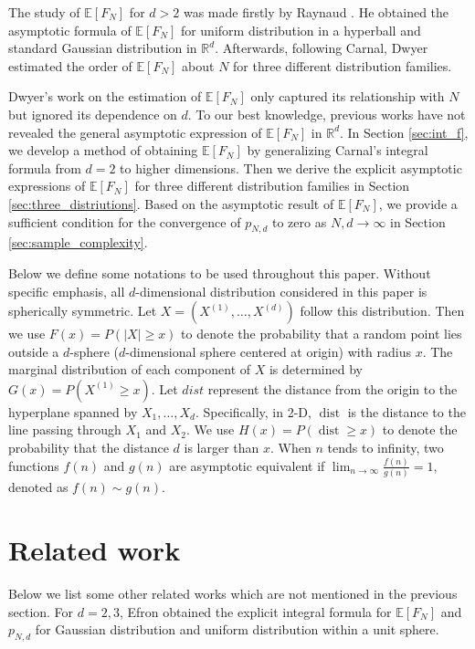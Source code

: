 \documentclass{aptpub}
\DeclareMathOperator{\dist}{dist}
\def\E{\mathbb{E}}
\def\R{\mathbb{R}}
\begin{document}
The study of $\E[F_N]$ for $d>2$ was made firstly by
Raynaud
\cite{raynaud1970enveloppe}.
He obtained the asymptotic formula of $\E[F_N]$
for uniform distribution in a hyperball
and standard Gaussian distribution in $\mathbb{R}^d$.
Afterwards, following Carnal, Dwyer \cite{dwyer1991convex}
estimated the order of $\E[F_N]$ about $N$
for three different distribution families.

Dwyer's work on the estimation of $\E[F_N]$ only captured its relationship with $N$ but ignored its
dependence on $d$. To our best knowledge, previous works have not revealed the general asymptotic expression of $\E[F_N]$ in $\R^d$.
In Section \ref{sec:int_f}, we develop a method of obtaining $\E[F_N]$ by generalizing Carnal's integral formula
from $d=2$ to higher dimensions.
Then we derive the explicit asymptotic
expressions of $\E[F_N]$ for three different distribution families in Section \ref{sec:three_distriutions}.
Based on the asymptotic result of $\E[F_N]$,
we provide a sufficient condition for the convergence of $p_{N,d}$ to zero as $N,d \to \infty$
in Section \ref{sec:sample_complexity}.

Below we define some notations to be used throughout this paper.
Without specific emphasis, all $d$-dimensional distribution considered in this paper is spherically symmetric.
Let $X=(X^{(1)},\dots, X^{(d)})$ follow this distribution.
Then we use $F(x)=P(|X|\geq x)$ to denote the probability that a random point lies outside
a $d$-sphere ($d$-dimensional sphere centered at origin) with radius $x$.
The marginal distribution of each component of $X$ is determined by $G(x)=P(X^{(1)}\geq x)$.
Let $dist$ represent the distance from the origin to the hyperplane spanned by $X_1, \dots, X_d$.
Specifically, in 2-D, $\dist$ is the distance to the line passing through $X_1$ and $X_2$.
We use $H(x)=P(\dist\geq x)$ to denote the probability that the distance $d$ is larger than $x$.
When $n$ tends to infinity, two functions $f(n)$ and $g(n)$ are asymptotic equivalent if $\lim_{n\to \infty} \frac{f(n)}{g(n)}=1$,
denoted as $f(n) \sim g(n)$.

\section{Related work}
Below we list some other related works which are not mentioned in the previous section.
For $d=2,3$, Efron \cite{efron1965convex} obtained the explicit integral formula for $\E[F_N]$ and $p_{N,d}$ 
for Gaussian distribution and uniform distribution within a unit sphere.
\end{document}

